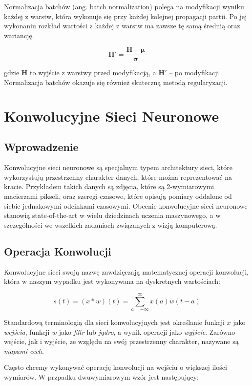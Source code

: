 \documentclass[licencjacka]{pracamgr}
\begin{document}
Normalizacja batchów (ang. batch normalization) \cite{batch-norm} polega na modyfikacji wyniku każdej z warstw, która wykonuje się przy każdej kolejnej propagacji partii. Po jej wykonaniu rozkład wartości z każdej z warstw ma zawsze tę samą średnią oraz wariancję.

$$ \mathbf{H'} = \frac{\mathbf{H} - \mathbf{\mu}}{\mathbf{\sigma}} $$

gdzie $ \mathbf{H} $ to wyjście z warstwy przed modyfikacją, a $ \mathbf{H'} $ -- po modyfikacji. Normalizacja batchów okazuje się również skuteczną metodą regularyzacji.

\section{Konwolucyjne Sieci Neuronowe}

\subsection{Wprowadzenie}

Konwolucyjne sieci neuronowe \cite{lecun-cnn, krizhevsky-cnn} są specjalnym typem architektury sieci, które wykorzystują przestrzenny charakter danych, które można reprezentować na kracie. Przykładem takich danych są zdjęcia, które są 2-wymiarowymi macierzami pikseli, oraz szeregi czasowe, które opisują pomiary oddalone od siebie jednakowymi odcinkami czasowymi. Obecnie konwolucyjne sieci neuronowe stanowią state-of-the-art w wielu dziedzinach uczenia maszynowego, a w szczególności we wszelkich zadaniach związanych z wizją komputerową. 

\subsection{Operacja Konwolucji}

Konwolucyjne sieci swoją nazwę zawdzięczają matematycznej operacji konwolucji, która w naszym wypadku jest wykonywana na dyskretnych wartościach:

$$ s(t) = (x * w)(t) = \sum_{a = -\infty}^{\infty} x(a)w(t - a) $$

Standardową terminologią dla sieci konwolucyjnych jest określanie funkcji $x$ jako \emph{wejścia}, funkcji $w$ jako \emph{filtr} lub \emph{jądro}, a wynik operacji jako \emph{wyjście}. Zarówno wejście, jak i wyjście, ze względu na swój przestrzenny charakter, nazywane są \emph{mapami cech}.

Często chcemy wykonywać operację konwolucji na wejściu o większej ilości wymiarów. W przpadku dwuwymiarowym wzór jest następujący:
\end{document}
